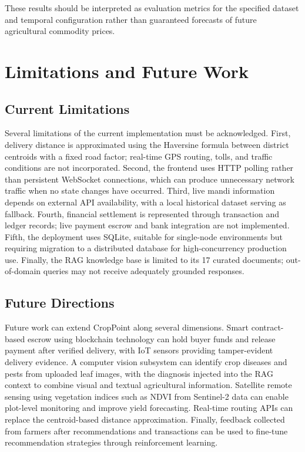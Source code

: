 \documentclass[conference]{IEEEtran}
\begin{document}
These results should be interpreted as evaluation metrics for the
specified dataset and temporal configuration rather than guaranteed
forecasts of future agricultural commodity prices.

\section{Limitations and Future Work}

\subsection{Current Limitations}

Several limitations of the current implementation must be
acknowledged. First, delivery distance is approximated using the
Haversine formula between district centroids with a fixed road
factor; real-time GPS routing, tolls, and traffic conditions are
not incorporated. Second, the frontend uses HTTP polling rather
than persistent WebSocket connections, which can produce unnecessary
network traffic when no state changes have occurred. Third, live
mandi information depends on external API availability, with a
local historical dataset serving as fallback. Fourth, financial
settlement is represented through transaction and ledger records;
live payment escrow and bank integration are not implemented.
Fifth, the deployment uses SQLite, suitable for single-node
environments but requiring migration to a distributed database for
high-concurrency production use. Finally, the RAG knowledge base
is limited to its 17 curated documents; out-of-domain queries may
not receive adequately grounded responses.

\subsection{Future Directions}

Future work can extend CropPoint along several dimensions.
Smart contract-based escrow using blockchain technology can hold
buyer funds and release payment after verified delivery, with IoT
sensors providing tamper-evident delivery evidence. A computer
vision subsystem can identify crop diseases and pests from uploaded
leaf images, with the diagnosis injected into the RAG context to
combine visual and textual agricultural information. Satellite
remote sensing using vegetation indices such as NDVI from Sentinel-2
data can enable plot-level monitoring and improve yield forecasting.
Real-time routing APIs can replace the centroid-based distance
approximation. Finally, feedback collected from farmers after
recommendations and transactions can be used to fine-tune
recommendation strategies through reinforcement learning.
\end{document}
